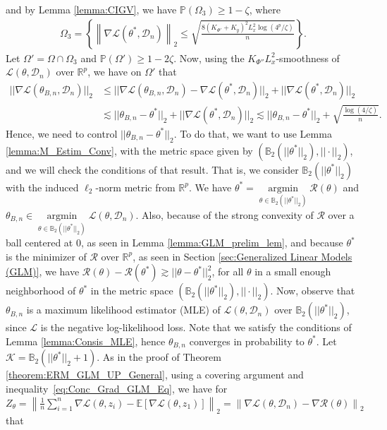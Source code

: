 \documentclass{article}
\begin{document}
and by Lemma \ref{lemma:CIGV}, we have $\mathbb{P}(\Omega_3) \geq 1 - \zeta$, where
\begin{align*}
\Omega_3 = \left\{\left\|\nabla \mathcal{L}(\theta^*, \mathcal{D}_n)\right\|_2  \leq \sqrt{\frac{8(K_{\Phi'} + K_y)^2L_x^2\log(4^p/\zeta)}{n}}\right\}.
\end{align*} 
Let $\Omega' = \Omega \cap \Omega_3$ and $\mathbb{P}(\Omega') \geq 1 - 2\zeta$. Now, using the $K_{\Phi''}L_x^2$-smoothness of $\mathcal{L}(\theta, \mathcal{D}_n)$ over $\mathbb{R}^p$, we have on $\Omega'$ that
\begin{align*}
||\nabla \mathcal{L}(\theta_{B, n}, \mathcal{D}_n)||_2 &\leq ||\nabla \mathcal{L}(\theta_{B, n}, \mathcal{D}_n) - \nabla \mathcal{L}(\theta^*, \mathcal{D}_n)||_2 + ||\nabla \mathcal{L}(\theta^*, \mathcal{D}_n)||_2\\
&\lesssim ||\theta_{B, n} - \theta^*||_2 + ||\nabla \mathcal{L}(\theta^*, \mathcal{D}_n)||_2 \lesssim ||\theta_{B, n} - \theta^*||_2 + \sqrt{\frac{\log(4/\zeta)}{n}}.
\end{align*}
Hence, we need to control $||\theta_{B, n} - \theta^*||_2$. To do that, we want  to use Lemma \ref{lemma:M_Estim_Conv}, with the metric space given by $(\mathbb{B}_2(||\theta^*||_2), ||\cdot||_2)$,  and we will check the conditions of that result. That is, we consider $\mathbb{B}_2(||\theta^*||_2)$ with the induced $\ell_2$-norm metric from $\mathbb{R}^p$. We have $\theta^* = \mathop{\arg\min}\limits_{\theta \in \mathbb{B}_2(||\theta^*||_2)}\mathcal{R}(\theta)$ and $\theta_{B, n} \in \mathop{\arg\min}\limits_{\theta \in \mathbb{B}_2(||\theta^*||_2)}\mathcal{L}(\theta, \mathcal{D}_n)$. Also, because of the strong convexity of $\mathcal{R}$ over a ball centered at $0$, as seen in Lemma \ref{lemma:GLM_prelim_lem}, and because $\theta^*$ is the minimizer of $\mathcal{R}$ over $\mathbb{R}^p$, as seen in Section \ref{sec:Generalized Linear Models (GLM)}, we have $\mathcal{R}(\theta) - \mathcal{R}(\theta^*) \gtrsim ||\theta - \theta^*||_2^2$, for all $\theta$ in a small enough neighborhood of $\theta^*$ in the metric space $(\mathbb{B}_2(||\theta^*||_2), ||\cdot||_2)$. Now, observe that $\theta_{B, n}$ is a maximum likelihood estimator (MLE) of $\mathcal{L}(\theta, \mathcal{D}_n)$ over $\mathbb{B}_2(||\theta^*||_2)$, since $\mathcal{L}$ is the negative log-likelihood loss. Note that we satisfy the conditions of Lemma \ref{lemma:Consis_MLE}, hence $\theta_{B, n}$ converges in probability to $\theta^*$. Let $\mathcal{K} = \mathbb{B}_2(||\theta^*||_2 + 1)$. As in the proof of Theorem \ref{theorem:ERM_GLM_UP_General}, using a covering argument and inequality~\eqref{eq:Conc_Grad_GLM_Eq}, we have for $Z_\theta = \left\|\frac{1}{n}\sum_{i = 1}^n\nabla \mathcal{L}(\theta, z_i) - \mathbb{E}[\nabla \mathcal{L}(\theta, z_1)]\right\|_2 = \left\|\nabla \mathcal{L}(\theta, \mathcal{D}_n) - \nabla \mathcal{R}(\theta)\right\|_2$ that
\end{document}
